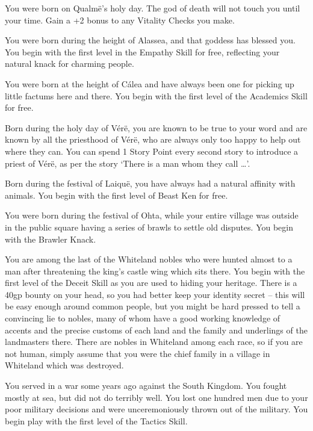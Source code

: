 \begin{multicols}{2}
\begin{list}{\addtocounter{list}{1}\textbf{:}}{\raggedleft}
\item{You were born on Qualm\"{e}'s holy day.  The god of death will not touch you until your time.  Gain a +2 bonus to any Vitality Checks you make.}

\item{You were born during the height of Alassea, and that goddess has blessed you.  You begin with the first level in the Empathy Skill for free, reflecting your natural knack for charming people.}

\item{You were born at the height of C\'{a}lea and have always been one for picking up little factums here and there.  You begin with the first level of the Academics Skill for free.}

\item{Born during the holy day of V\'{e}r\"{e}, you are known to be true to your word and are known by all the priesthood of V\'{e}r\"{e}, who are always only too happy to help out where they can.  You can spend 1 Story Point every second story to introduce a priest of V\'{e}r\"{e}, as per the story `There is a man whom they call \ldots'.}

\item{Born during the festival of Laiqu\"{e}, you have always had a natural affinity with animals.  You begin with the first level of Beast Ken for free.}

\item{You were born during the festival of Ohta, while your entire village was outside in the public square having a series of brawls to settle old disputes.  You begin with the Brawler Knack.}

\item{You are among the last of the Whiteland nobles who were hunted almost to a man after threatening the king's castle wing which sits there.  You begin with the first level of the Deceit Skill as you are used to hiding your heritage.  There is a 40gp bounty on your head, so you had better keep your identity secret -- this will be easy enough around common people, but you might be hard pressed to tell a convincing lie to nobles, many of whom have a good working knowledge of accents and the precise customs of each land and the family and underlings of the landmasters there.  There are nobles in Whiteland among each race, so if you are not human, simply assume that you were the chief family in a village in Whiteland which was destroyed.}

\item{You served in a war some years ago against the South Kingdom.  You fought mostly at sea, but did not do terribly well.  You lost one hundred men due to your poor military decisions and were unceremoniously thrown out of the military.  You begin play with the first level of the Tactics Skill.}


\end{list}
\end{multicols}
